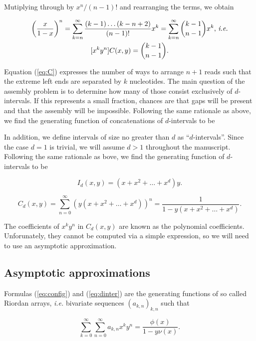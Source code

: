 \documentclass{article}
\begin{document}
Mutiplying through by $x^n/(n-1)!$ and rearranging the terms, we obtain

\begin{gather}
\notag
\left( \frac{x}{1-x} \right)^n =
\sum_{k=n}^\infty \frac{(k-1) \ldots (k-n+2)}{(n-1)!} x^k
= \sum_{k=n}^\infty {k-1 \choose n-1} x^k \text{, \textit{i.e.}} \\
\label{eq:C}
[x^ky^n]C(x,y) = {k-1 \choose n-1}.
\end{gather}

Equation (\ref{eq:C}) expresses the number of ways to arrange $n+1$ reads
such that the extreme left ends are separated by $k$ nucleotides. The main
question of the assembly problem is to determine how many of those consist
exclusively of $d$-intervals. If this represents a small fraction, chances
are that gaps will be present and that the assembly will be impossible.
Following the same rationale as above, we find the generating function of
concatenations of $d$-intervals to be

In addition, we define intervals of size no greater than $d$ as
``$d$-intervals''. Since the case $d=1$ is trivial, we will assume $d > 1$
throughout the manuscript. Following the same rationale as bove, we find
the generating function of $d$-intervals to be

\begin{equation}
\label{eq:dintervals}
I_d(x,y) = (x+x^2+\ldots+x^d)y.
\end{equation}

\begin{equation}
\label{eq:dinter}
C_d(x,y) = \sum_{n=0}^\infty \left(y(x+x^2+\ldots+x^d)\right)^n =
\frac{1}{1-y(x+x^2+\ldots+x^d)}.
\end{equation}

The coefficients of $x^ky^n$ in $C_d(x,y)$ are known as the polynomial
coefficients. Unforunately, they cannot be computed via a simple
expression, so we will need to use an asymptotic approximation.

\subsection{Asymptotic approximations}

Formulas (\ref{eq:config}) and (\ref{eq:dinter}) are the generating
functions of so called Riordan arrays, \textit{i.e.} bivariate sequences
$(a_{k,n})_{k,n}$ such that

\begin{equation*}
\sum_{k=0}^\infty \sum_{n=0}^\infty a_{k,n} x^k y^n =
\frac{\phi(x)}{1-y \nu(x)}.
\end{equation*}
\end{document}
